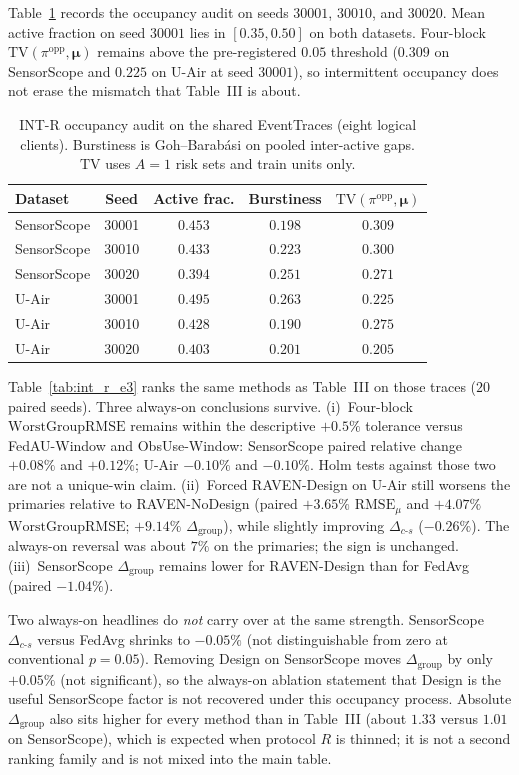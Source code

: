 Table~\ref{tab:int_r_occ} records the occupancy audit on seeds
$30001$, $30010$, and $30020$.  Mean active fraction on seed $30001$
lies in $[0.35,0.50]$ on both datasets.  Four-block
$\mathrm{TV}(\pi^{\mathrm{opp}},\boldsymbol\mu)$ remains above the
pre-registered $0.05$ threshold ($0.309$ on SensorScope and $0.225$ on
U-Air at seed $30001$), so intermittent occupancy does not erase the
mismatch that Table~III is about.

\begin{table}[!htbp]
\centering
\caption{INT-R occupancy audit on the shared EventTraces (eight logical
clients).  Burstiness is Goh--Barab\'asi on pooled inter-active gaps.
$\mathrm{TV}$ uses $A=1$ risk sets and train units only.}
\label{tab:int_r_occ}
\scriptsize
\begin{tabular}{lcccc}
\toprule
Dataset & Seed & Active frac. & Burstiness & $\mathrm{TV}(\pi^{\mathrm{opp}},\boldsymbol\mu)$\\
\midrule
SensorScope & 30001 & $0.453$ & $0.198$ & $0.309$\\
SensorScope & 30010 & $0.433$ & $0.223$ & $0.300$\\
SensorScope & 30020 & $0.394$ & $0.251$ & $0.271$\\
U-Air & 30001 & $0.495$ & $0.263$ & $0.225$\\
U-Air & 30010 & $0.428$ & $0.190$ & $0.275$\\
U-Air & 30020 & $0.403$ & $0.201$ & $0.205$\\
\bottomrule
\end{tabular}
\end{table}

Table~\ref{tab:int_r_e3} ranks the same methods as
Table~III on those traces ($20$ paired seeds).
Three always-on conclusions survive.  (i)~Four-block
$\mathrm{WorstGroupRMSE}$ remains within the descriptive $+0.5\%$
tolerance versus FedAU-Window
and ObsUse-Window: SensorScope paired relative
change $+0.08\%$ and $+0.12\%$; U-Air $-0.10\%$ and $-0.10\%$.  Holm tests
against those two are not a unique-win claim.  (ii)~Forced RAVEN-Design on U-Air
still worsens the primaries relative to RAVEN-NoDesign
(paired $+3.65\%$ $\mathrm{RMSE}_{\mu}$ and $+4.07\%$
$\mathrm{WorstGroupRMSE}$; $+9.14\%$ $\Delta_{\mathrm{group}}$), while
slightly improving $\Delta_{c\text{-}s}$ ($-0.26\%$).  The always-on
reversal was about $7\%$ on the primaries; the sign is unchanged.
(iii)~SensorScope $\Delta_{\mathrm{group}}$ remains lower for
RAVEN-Design than for FedAvg (paired $-1.04\%$).

Two always-on headlines do \emph{not} carry over at the same strength.
SensorScope $\Delta_{c\text{-}s}$ versus FedAvg shrinks to
$-0.05\%$ (not distinguishable from zero at conventional $p=0.05$).
Removing Design on SensorScope moves
$\Delta_{\mathrm{group}}$ by only $+0.05\%$ (not significant), so the
always-on ablation statement that Design is the useful SensorScope factor is
not recovered under this occupancy process.  Absolute
$\Delta_{\mathrm{group}}$ also sits higher for every method than in
Table~III (about $1.33$ versus $1.01$ on
SensorScope), which is expected when protocol $R$ is thinned; it is not
a second ranking family and is not mixed into the main table.

